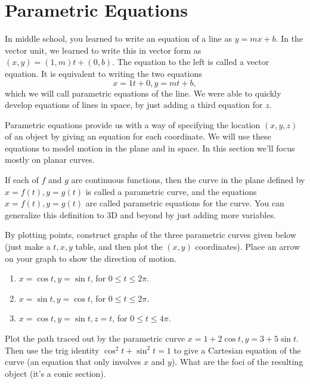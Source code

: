 
\section{Parametric Equations}
In middle school, you learned to write an equation of a line as $y=mx+b$.  In the vector unit, we learned to write this in vector form as $(x,y)=(1,m)t+(0,b)$. The equation to the left is called a vector equation.  It is equivalent to writing the two equations $$x=1t+0,y=mt+b,$$ which we will call parametric equations of the line. We were able to quickly develop equations of lines in space, by just adding a third equation for $z$.

Parametric equations provide us with a way of specifying the location $(x,y,z)$ of an object by giving an equation for each coordinate.  We will use these equations to model motion in the plane and in space.  In this section we'll focus mostly on planar curves.

\begin{definition}
If each of $f$ and $g$ are continuous functions, then the curve in the plane defined by $x=f(t),y=g(t)$ is called a parametric curve, and the equations $x=f(t),y=g(t)$ are called parametric equations for the curve. You can generalize this definition to 3D and beyond by just adding more variables.
\end{definition}

\begin{problem} 
%
By plotting points, construct graphs of the three parametric curves given below (just make a $t,x,y$ table, and then plot the $(x,y)$ coordinates).  Place an arrow on your graph to show the direction of motion.
\begin{enumerate}
\item $x=\cos t, y=\sin t$, for $0\leq t\leq 2\pi$.
\item $x=\sin t, y=\cos t$, for $0\leq t\leq 2\pi$.
\item $x=\cos t, y=\sin t, z=t$, for $0\leq t\leq 4\pi$.
\end{enumerate} 
\end{problem}

\begin{problem}
Plot the path traced out by the parametric curve $x=1+2\cos t, y=3+5\sin t$.  Then use the trig identity $\cos^2t+\sin^2t=1$ to give a Cartesian equation of the curve (an equation that only involves $x$ and $y$). What are the foci of the resulting object (it's a conic section).
\end{problem}

